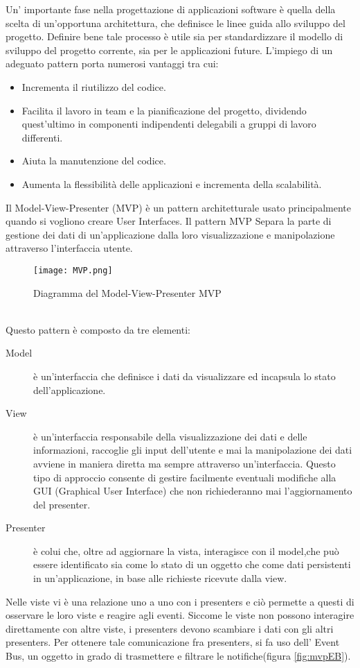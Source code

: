 Un' importante fase nella progettazione di applicazioni software \`e quella della scelta di un'opportuna architettura, che definisce le linee guida allo sviluppo del progetto. Definire bene tale processo \`e utile sia per standardizzare il modello di sviluppo del progetto corrente, sia per le applicazioni
future.
L'impiego di un adeguato pattern porta numerosi vantaggi tra cui:
\begin{itemize}
\item Incrementa il riutilizzo del codice.
\item Facilita il lavoro in team e la pianificazione del progetto, dividendo
quest'ultimo in componenti indipendenti delegabili a gruppi di lavoro
differenti.
\item Aiuta la manutenzione del codice.
\item Aumenta la flessibilit\`a delle applicazioni e incrementa della scalabilit\`a.
\end{itemize}
Il Model-View-Presenter (MVP) \`e un pattern architetturale usato principalmente quando si vogliono creare User Interfaces. 
Il pattern MVP Separa la parte di gestione dei dati di un'applicazione dalla loro visualizzazione e manipolazione attraverso l'interfaccia utente. 
\begin{figure}[htbp]
\centering%
\texttt{[image: MVP.png]}%
\caption{Diagramma del Model-View-Presenter MVP}\label{fig:mvp}%
\end{figure}\\
Questo pattern \`e composto da tre elementi:
\begin{description}
\item[Model] \`e un'interfaccia che definisce i dati da visualizzare ed incapsula lo stato dell'applicazione.
\item[View] \`e un'interfaccia responsabile della visualizzazione dei
dati e delle informazioni, raccoglie gli input dell'utente e mai la manipolazione dei dati avviene in maniera diretta ma sempre attraverso un'interfaccia. Questo tipo di approccio consente di gestire facilmente eventuali modifiche alla GUI (Graphical User Interface) che non richiederanno mai l'aggiornamento del presenter.
\item[Presenter]  \`e colui che, oltre ad aggiornare la vista, interagisce con il model,che pu\`o essere identificato sia come lo stato di un oggetto che come dati persistenti in un'applicazione, in base alle richieste ricevute dalla view.
\end{description}
Nelle viste vi \`e una relazione uno a uno con i presenters e ci\`o permette a questi di osservare le loro viste e reagire agli eventi. Siccome le viste non possono interagire direttamente con altre viste, i presenters devono scambiare i dati con gli altri presenters. Per ottenere tale comunicazione  fra presenters, si fa uso dell' Event Bus, un oggetto in grado di trasmettere e filtrare le notifiche(figura \ref{fig:mvpEB}).

